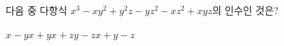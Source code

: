 다음 중 다항식 $x^3-xy^2+y^2z-yz^2-xz^2+xyz$의 인수인 것은?
\begin{choices32}{$x-y$}{$x+y$}{$x+z$}{$y-z$}{$x+y-z$}\end{choices32}
